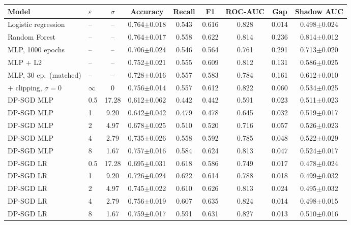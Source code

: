 \begin{tabular}{@{}llccccccc@{}}
\toprule
Model & $\varepsilon$ & $\sigma$ & Accuracy & Recall & F1 & ROC-AUC & Gap & Shadow AUC \\
\midrule
Logistic regression & -- & -- & 0.764$\pm$0.018 & 0.543 & 0.616 & 0.828 & 0.014 & 0.498$\pm$0.024 \\
Random Forest & -- & -- & 0.764$\pm$0.017 & 0.558 & 0.622 & 0.814 & 0.236 & 0.814$\pm$0.012 \\
MLP, 1000 epochs & -- & -- & 0.706$\pm$0.024 & 0.546 & 0.564 & 0.761 & 0.291 & 0.713$\pm$0.020 \\
MLP + L2 & -- & -- & 0.752$\pm$0.021 & 0.555 & 0.609 & 0.812 & 0.131 & 0.586$\pm$0.025 \\
MLP, 30 ep.\ (matched) & -- & -- & 0.728$\pm$0.016 & 0.557 & 0.583 & 0.784 & 0.161 & 0.612$\pm$0.010 \\
+ clipping, $\sigma{=}0$ & $\infty$ & 0 & 0.756$\pm$0.014 & 0.557 & 0.612 & 0.822 & 0.060 & 0.534$\pm$0.025 \\
\midrule
DP-SGD MLP & 0.5 & 17.28 & 0.612$\pm$0.062 & 0.442 & 0.442 & 0.591 & 0.023 & 0.511$\pm$0.023 \\
DP-SGD MLP & 1 & 9.20 & 0.642$\pm$0.042 & 0.479 & 0.478 & 0.645 & 0.032 & 0.519$\pm$0.017 \\
DP-SGD MLP & 2 & 4.97 & 0.678$\pm$0.025 & 0.510 & 0.520 & 0.716 & 0.057 & 0.526$\pm$0.023 \\
DP-SGD MLP & 4 & 2.79 & 0.735$\pm$0.026 & 0.558 & 0.592 & 0.785 & 0.048 & 0.522$\pm$0.029 \\
DP-SGD MLP & 8 & 1.67 & 0.757$\pm$0.016 & 0.584 & 0.624 & 0.813 & 0.047 & 0.524$\pm$0.017 \\
\midrule
DP-SGD LR & 0.5 & 17.28 & 0.695$\pm$0.031 & 0.618 & 0.586 & 0.749 & 0.017 & 0.478$\pm$0.024 \\
DP-SGD LR & 1 & 9.20 & 0.726$\pm$0.024 & 0.622 & 0.614 & 0.788 & 0.018 & 0.499$\pm$0.032 \\
DP-SGD LR & 2 & 4.97 & 0.745$\pm$0.022 & 0.610 & 0.626 & 0.813 & 0.024 & 0.495$\pm$0.032 \\
DP-SGD LR & 4 & 2.79 & 0.756$\pm$0.019 & 0.607 & 0.635 & 0.824 & 0.014 & 0.498$\pm$0.015 \\
DP-SGD LR & 8 & 1.67 & 0.759$\pm$0.017 & 0.591 & 0.631 & 0.827 & 0.013 & 0.510$\pm$0.016 \\
\bottomrule
\end{tabular}
